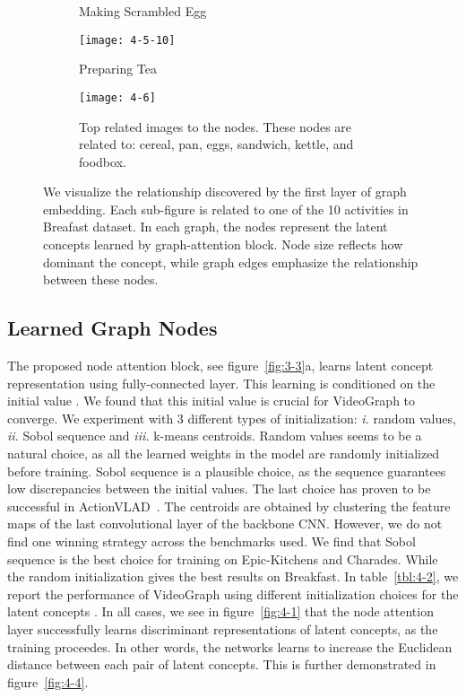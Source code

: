 \documentclass[10pt,twocolumn,letterpaper]{article}
\begin{document}
\begin{figure*}
\begin{subfigure}[t]{0.195\textwidth}
\caption{Making Scrambled Egg}
\vspace*{0mm}
\label{fig:4-5-9}
\end{subfigure}
\hfill
\begin{subfigure}[t]{0.195\textwidth}
\texttt{[image: 4-5-10]}
\caption{Preparing Tea}
\vspace*{0mm}
\label{fig:4-5-10}
\end{subfigure}
\vfill
\begin{subfigure}[t]{1.0\textwidth}
\texttt{[image: 4-6]}
\caption{Top related images to the nodes.
These nodes are related to: \textcolor{colornode05}{\newmoon} cereal, \textcolor{colornode08}{\newmoon} pan, \textcolor{colornode09}{\newmoon} eggs, \textcolor{colornode01}{\newmoon} sandwich, \textcolor{colornode04}{\newmoon} kettle, and \textcolor{colornode06}{\newmoon} foodbox.}
\vspace*{0mm}
\label{fig:4-5-11}
\end{subfigure}
\caption{We visualize the relationship discovered by the first layer of graph embedding.
Each sub-figure is related to one of the 10 activities in Breafast dataset.
In each graph, the nodes represent the latent concepts learned by graph-attention block. Node size reflects how dominant the concept, while graph edges emphasize the relationship between these nodes.}
\label{fig:4-5}
\end{figure*}

\subsection{Learned Graph Nodes}
The proposed node attention block, see figure~\ref{fig:3-3}{\color{red}a}, learns latent concept representation  using fully-connected layer.
This learning is conditioned on the initial value .
We found that this initial value is crucial for VideoGraph to converge.
We experiment with 3 different types of initialization: \textit{i.} random values, \textit{ii.} Sobol sequence and \textit{iii.} k-means centroids.
Random values seems to be a natural choice, as all the learned weights in the model are randomly initialized before training.
Sobol sequence is a plausible choice, as the sequence guarantees low discrepancies between the initial values.
The last choice has proven to be successful in ActionVLAD~\cite{girdhar2017actionvlad}. The centroids are obtained by clustering the feature maps of the last convolutional layer of the backbone CNN.
However, we do not find one winning strategy across the benchmarks used.
We find that Sobol sequence is the best choice for training on Epic-Kitchens and Charades.
While the random initialization gives the best results on Breakfast.
In table~\ref{tbl:4-2}, we report the performance of VideoGraph using different initialization choices for the latent concepts .
In all cases, we see in figure~\ref{fig:4-1} that the node attention layer successfully learns discriminant representations of latent concepts, as the training proceedes.
In other words, the networks learns to increase the Euclidean distance between each pair of latent concepts.
This is further demonstrated in figure~\ref{fig:4-4}.
\end{document}
